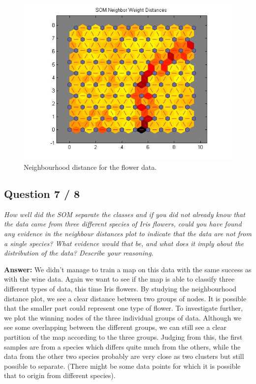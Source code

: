 \documentclass[a4paper]{article}
\begin{document}
  \begin{figure}[H] %
	 \includegraphics[scale=0.5]{q4_100o_1900tuningphase.jpg}
	 \caption{\label{fig:neighbour} Neighbourhood distance for the flower data.}
 \end{figure}

\subsection*{Question 7 / 8}
\emph{How well did the SOM separate the classes and if you did not already know that the data came from three different species of Iris flowers, could you have found any evidence in the neighbour distances plot to indicate that the data are not from a single species? What evidence would that be, and what does it imply about the distribution of the data?
Describe your reasoning.}

 \textbf{Answer: } We didn't manage to train a map on this data with the same success as with the wine data. Again we want to see if the map is able to classify three different types of data, this time Iris flowers. By studying the neighbourhood distance plot, we see a clear distance between two groups of nodes. It is possible that the smaller part could represent one type of flower. To investigate further, we plot the winning nodes of the three individual groups of data. Although we see some overlapping between the different groups, we can still see a clear partition of the map according to the three groups. Judging from this, the first samples are from a species which differs quite much from the others, while the data from the other two species probably are very close as two clusters but still possible to separate. (There might be some data points for which it is possible that to origin from different species).
\end{document}
